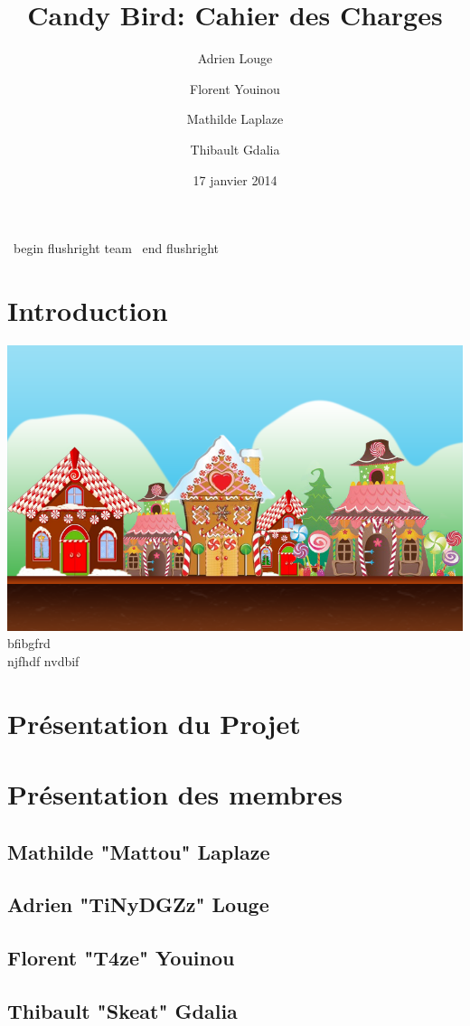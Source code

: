 \documentclass [11pt]{report}
\title {\textbf{ {Candy Bird: Cahier des Charges}}}
\author{Adrien Louge \and Florent Youinou \and Mathilde Laplaze \and Thibault Gdalia}
\date{17 janvier 2014}
\begin{document}
\ begin { flushright }
team
\ end { flushright }

\renewcommand{\baselinestretch}{0.001}
\maketitle
\tableofcontents

\chapter {Introduction}
\includegraphics[width=\textwidth]{images/BG1.png} 
bfibgfrd
\\njfhdf
\newpage
nvdbif
\chapter {Pr\'esentation du Projet}

\chapter {Pr\'esentation des membres}
	\section {Mathilde "Mattou" Laplaze}
	\section {Adrien "TiNyDGZz" Louge}
	\section {Florent "T4ze" Youinou}
	\section {Thibault "Skeat" Gdalia}
	
\end{document}
